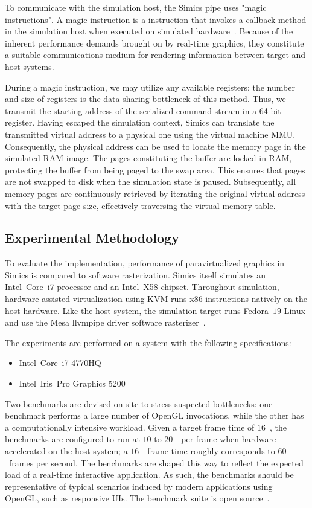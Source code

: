 To communicate with the simulation host, the Simics pipe uses "magic instructions".
A magic instruction is a  instruction that invokes a callback-method in the simulation host when executed on simulated hardware~.
Because of the inherent performance demands brought on by real-time graphics, they constitute a suitable communications medium for rendering information between target and host systems.

During a magic instruction, we may utilize any available registers; the number and size of registers is the data-sharing bottleneck of this method.
Thus, we transmit the starting address of the serialized command stream in a 64-bit register.
Having escaped the simulation context, Simics can translate the transmitted virtual address to a physical one using the virtual machine MMU.
Consequently, the physical address can be used to locate the memory page in the simulated RAM image.
The pages constituting the buffer are locked in RAM, protecting the buffer from being paged to the swap area.
This ensures that pages are not swapped to disk when the simulation state is paused.
Subsequently, all memory pages are continuously retrieved by iterating the original virtual address with the target page size, effectively traversing the virtual memory table.

\subsection{Experimental Methodology}
\label{sec:experimentalmethodology}
To evaluate the implementation, performance of paravirtualized graphics in Simics is compared to software rasterization.
Simics itself simulates an Intel\circledR ~Core\texttrademark ~i7 processor and an Intel\circledR ~X58 chipset.
Throughout simulation, hardware-assisted virtualization using KVM runs x86 instructions natively on the host hardware.
Like the host system, the simulation target runs Fedora~$19$ Linux and use the Mesa llvmpipe driver software rasterizer~.

The experiments are performed on a system with the following specifications:
\begin{itemize}
\item Intel\circledR\ Core\texttrademark\ i7-4770HQ
\item Intel\circledR\ Iris\texttrademark\ Pro Graphics 5200
\end{itemize}

Two benchmarks are devised on-site to stress suspected bottlenecks: one benchmark performs a large number of OpenGL invocations, while the other has a computationally intensive workload.
Given a target frame time of $16$~\milli\second , the benchmarks are configured to run at $10$ to $20$~\milli\second\ per frame when hardware accelerated on the host system; a $16$~\milli\second\ frame time roughly corresponds to $60$~frames per second.
The benchmarks are shaped this way to reflect the expected load of a real-time interactive application.
As such, the benchmarks should be representative of typical scenarios induced by modern applications using OpenGL, such as responsive UIs.
The benchmark suite is open source~.

